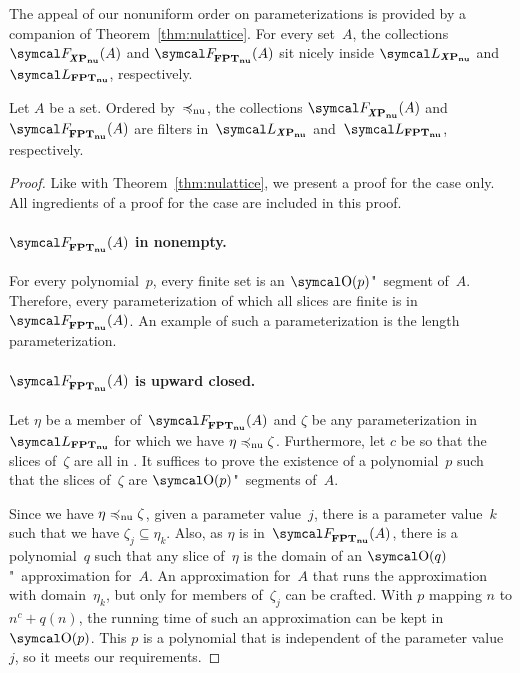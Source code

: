 The appeal of our nonuniform order on parameterizations is provided by a companion of Theorem~\ref{thm:nulattice}.
For every set~$A$, the collections $\calF_\clXnu{P}(A)$ and $\calF_\clnu{FPT}(A)$ sit nicely \parencite{davey2002introduction} inside $\calL_\clXnu{P}$ and $\calL_\clnu{FPT}$, respectively.
\begin{theorem}
\label{thm:nufilter}%
  Let $A$ be a set.
  Ordered by~$\preccurlyeq_\mathrm{nu}$, the collections $\calF_\clXnu{P}(A)$ and $\calF_\clnu{FPT}(A)$ are filters in~$\calL_\clXnu{P}$ and~$\calL_\clnu{FPT}$, respectively.
\end{theorem}
\begin{proof}
  Like with Theorem~\ref{thm:nulattice}, we present a proof for the  case only.
  All ingredients of a proof for the  case are included in this proof.

  \paragraph{$\calF_\clnu{FPT}(A)$ in nonempty.}
  For every polynomial~$p$, every finite set is an $\bigO(p)$"~segment of~$A$.
  Therefore, every parameterization of which all slices are finite is in~$\calF_\clnu{FPT}(A)$.
  An example of such a parameterization is the length parameterization.

  \paragraph{$\calF_\clnu{FPT}(A)$ is upward closed.}
  Let $\eta$ be a member of~$\calF_\clnu{FPT}(A)$ and $\zeta$ be any parameterization in~$\calL_\clnu{FPT}$ for which we have $\eta \preccurlyeq_\mathrm{nu} \zeta$.
  Furthermore, let $c$ be so that the slices of~$\zeta$ are all in .
  It suffices to prove the existence of a polynomial~$p$ such that the slices of~$\zeta$ are $\bigO(p)$"~segments of~$A$.

  Since we have $\eta \preccurlyeq_\mathrm{nu} \zeta$, given a parameter value~$j$, there is a parameter value~$k$ such that we have $\zeta_j \subseteq \eta_k$.
  Also, as $\eta$ is in~$\calF_\clnu{FPT}(A)$, there is a polynomial~$q$ such that any slice of~$\eta$ is the domain of an $\bigO(q)$"~approximation for~$A$.
  An approximation for~$A$ that runs the approximation with domain~$\eta_k$, but only for members of~$\zeta_j$ can be crafted.
  With $p$ mapping $n$ to $n^c + q(n)$, the running time of such an approximation can be kept in~$\bigO(p)$.
  This $p$ is a polynomial that is independent of the parameter value~$j$, so it meets our requirements.


\end{proof}
